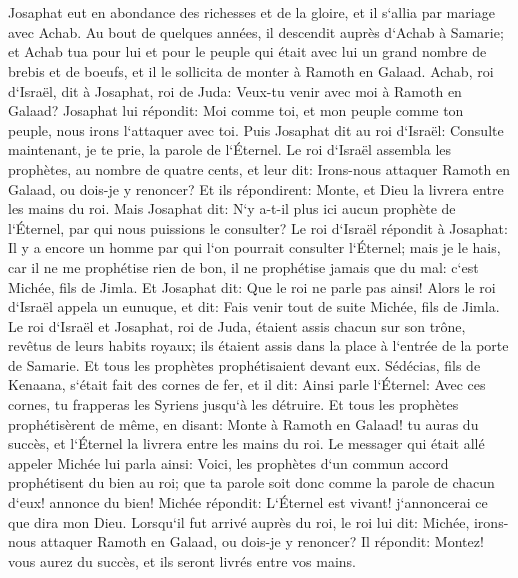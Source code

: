 \chapter{}

\verse Josaphat eut en abondance des richesses et de la gloire, et il s`allia par mariage avec Achab. 
\verse Au bout de quelques années, il descendit auprès d`Achab à Samarie; et Achab tua pour lui et pour le peuple qui était avec lui un grand nombre de brebis et de boeufs, et il le sollicita de monter à Ramoth en Galaad. 
\verse Achab, roi d`Israël, dit à Josaphat, roi de Juda: Veux-tu venir avec moi à Ramoth en Galaad? Josaphat lui répondit: Moi comme toi, et mon peuple comme ton peuple, nous irons l`attaquer avec toi. 
\verse Puis Josaphat dit au roi d`Israël: Consulte maintenant, je te prie, la parole de l`Éternel. 
\verse Le roi d`Israël assembla les prophètes, au nombre de quatre cents, et leur dit: Irons-nous attaquer Ramoth en Galaad, ou dois-je y renoncer? Et ils répondirent: Monte, et Dieu la livrera entre les mains du roi. 
\verse Mais Josaphat dit: N`y a-t-il plus ici aucun prophète de l`Éternel, par qui nous puissions le consulter? 
\verse Le roi d`Israël répondit à Josaphat: Il y a encore un homme par qui l`on pourrait consulter l`Éternel; mais je le hais, car il ne me prophétise rien de bon, il ne prophétise jamais que du mal: c`est Michée, fils de Jimla. Et Josaphat dit: Que le roi ne parle pas ainsi! 
\verse Alors le roi d`Israël appela un eunuque, et dit: Fais venir tout de suite Michée, fils de Jimla. 
\verse Le roi d`Israël et Josaphat, roi de Juda, étaient assis chacun sur son trône, revêtus de leurs habits royaux; ils étaient assis dans la place à l`entrée de la porte de Samarie. Et tous les prophètes prophétisaient devant eux. 
\verse Sédécias, fils de Kenaana, s`était fait des cornes de fer, et il dit: Ainsi parle l`Éternel: Avec ces cornes, tu frapperas les Syriens jusqu`à les détruire. 
\verse Et tous les prophètes prophétisèrent de même, en disant: Monte à Ramoth en Galaad! tu auras du succès, et l`Éternel la livrera entre les mains du roi. 
\verse Le messager qui était allé appeler Michée lui parla ainsi: Voici, les prophètes d`un commun accord prophétisent du bien au roi; que ta parole soit donc comme la parole de chacun d`eux! annonce du bien! 
\verse Michée répondit: L`Éternel est vivant! j`annoncerai ce que dira mon Dieu. 
\verse Lorsqu`il fut arrivé auprès du roi, le roi lui dit: Michée, irons-nous attaquer Ramoth en Galaad, ou dois-je y renoncer? Il répondit: Montez! vous aurez du succès, et ils seront livrés entre vos mains. 
